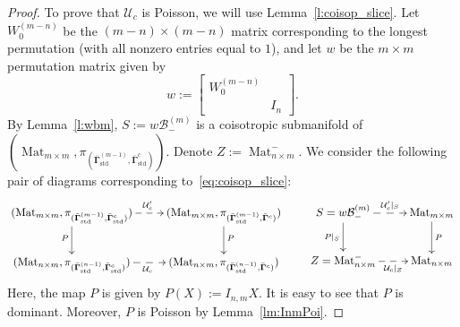 \documentclass[11pt]{article}
\newcommand{\bbg}{\bar{\mathbf{\Gamma}}}
\newcommand{\std}{\mathrm{std}}
\DeclareMathOperator{\Mat}{Mat}
\theoremstyle{definition}\newtheorem{definition}[theorem]{Definition}
\theoremstyle{definition}\newtheorem{remark}[theorem]{Remark}
\theoremstyle{remark}
\numberwithin{equation}{section}
\begin{document}
\begin{proof}
    To prove that $\mathcal{U}_c$ is Poisson, we will use Lemma~\ref{l:coisop_slice}. Let $W_0^{(m-n)}$ be the $(m-n)\times (m-n)$ matrix corresponding to the longest permutation (with all nonzero entries equal to $1$), and let $w$ be the $m \times m$ permutation matrix given by
    \begin{equation*}
        w:= \begin{bmatrix}
            W_0^{(m-n)} &\\
            & I_{n}
        \end{bmatrix}.
    \end{equation*}
    By Lemma~\ref{l:wbm}, $S:=w\mathcal{B}_-^{(m)}$ is a coisotropic submanifold of $(\Mat_{m \times m},\pi_{(\bbg^{(m-1)}_{\std},\bbg^c_{\std})})$. Denote $Z:=\Mat_{n\times m}^-$. We consider the following pair of diagrams corresponding to~\eqref{eq:coisop_slice}:
 \begin{equation}\label{eq:coisop_slice_uc}
    \xymatrix{
        (\Mat_{m\times m},\pi_{(\bbg_{\std}^{(m-1)},\bbg^c_{\std})}) \ar@{-->}[r]^{\mathcal{U}_c^\prime} \ar[d]_{P} & (\Mat_{m\times m},\pi_{(\bbg_{\std}^{(m-1)},\bbg^c)}) \ar[d]^{P} \\
        (\Mat_{n\times m},\pi_{(\bbg_{\std}^{(n-1)},\bbg^c_{\std})}) \ar@{-->}[r]_{\mathcal{U}_c} & (\Mat_{n\times m},\pi_{(\bbg_{\std}^{(n-1)},\bbg^c)}) 
        } \quad \quad 
    \xymatrix{
        S = w\mathcal{B}_-^{(m)} \ar@{-->}[r]^-{\mathcal{U}_c^\prime|_S} \ar[d]_{P|_S} & \Mat_{m\times m} \ar[d]^{P} \\
        Z = \Mat_{n\times m}^- \ar@{-->}[r]_-{\mathcal{U}_c|_{Z}} & \Mat_{n\times m}
        }
    \end{equation}
    Here, the map $P$ is given by $P(X) := I_{n,m}X$. It is easy to see that $P$ is dominant. Moreover, $P$ is Poisson by Lemma~\ref{lm:InmPoi}.


\end{proof}
\end{document}
